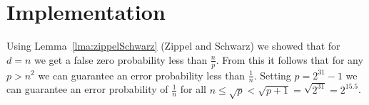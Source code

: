 \documentclass[a4paper,oneside,article,11pt]{memoir}
\begin{document}
\chapter{Implementation}
\label{impl}

Using Lemma~\ref{lma:zippelSchwarz} (Zippel and Schwarz) we showed that for $d = n$ we get a false zero probability less than $\frac{n}{p}$. From this it follows that for any $p > n^2$ we can guarantee an error probability less than $\frac{1}{n}$. Setting $p = 2^{31}-1$ we can guarantee an error probability of $\frac{1}{n}$ for all $n \leq \sqrt{p} < \sqrt{p+1} = \sqrt{2^{31}} = 2^{15.5}$.


\end{document}
